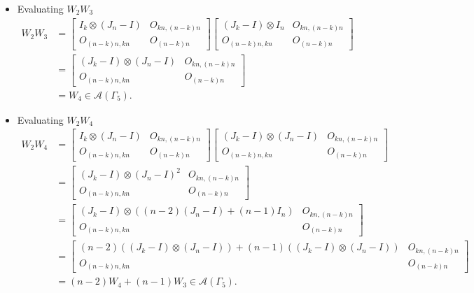 \begin{itemize}
\item Evaluating $W_{2}W_{3}$
\begin{align*}
W_2W_3 &=
\begin{bmatrix}
I_k \otimes (J_n - I) & O_{kn, (n-k)n} \\
O_{(n-k)n,kn} & O_{(n-k)n}
\end{bmatrix}
\begin{bmatrix}
(J_k - I) \otimes I_n & O_{kn, (n-k)n} \\
O_{(n-k)n,kn} & O_{(n-k)n}
\end{bmatrix} \\
&=
\begin{bmatrix}
(J_k - I) \otimes (J_n - I) & O_{kn, (n-k)n} \\
O_{(n-k)n,kn} & O_{(n-k)n}
\end{bmatrix}\\
&= W_4 \in\mathcal{A}(\Gamma_5).
\end{align*}

\item Evaluating $W_{2}W_{4}$
\begin{align*}
W_2W_4 &=
\begin{bmatrix}
I_k \otimes (J_n - I) & O_{kn, (n-k)n} \\
O_{(n-k)n,kn} & O_{(n-k)n}
\end{bmatrix}
\begin{bmatrix}
(J_k - I) \otimes (J_n - I) & O_{kn, (n-k)n} \\
O_{(n-k)n,kn} & O_{(n-k)n}
\end{bmatrix}\\
&= \begin{bmatrix}
(J_k - I) \otimes (J_n - I)^2 & O_{kn, (n-k)n} \\
O_{(n-k)n,kn} & O_{(n-k)n}
\end{bmatrix}\\
&= \begin{bmatrix}
(J_k - I) \otimes ((n-2)(J_n - I) + (n-1)I_n) & O_{kn, (n-k)n} \\
O_{(n-k)n,kn} & O_{(n-k)n}  
\end{bmatrix}\\
&= \begin{bmatrix}
(n-2)((J_k - I) \otimes (J_n - I)) + (n-1)((J_k - I)\otimes (J_n-I)) & O_{kn, (n-k)n} \\
O_{(n-k)n,kn} & O_{(n-k)n}  
\end{bmatrix}\\
&= (n-2)W_4 + (n-1)W_3 \in\mathcal{A}(\Gamma_5).
\end{align*}


\end{itemize}

